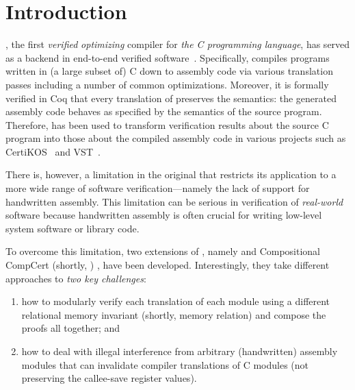\section{Introduction}\label{sec:introduction}


\cc{} \cite{CompCert, Compcert-CACM}, the first \emph{verified}
\emph{optimizing} compiler for \emph{the C programming language}, has
served as a backend in end-to-end verified
software~\cite{appel2014program}. Specifically, \cc{} compiles programs written in (a
large subset of) C down to assembly code via various translation
passes including a number of common optimizations.  Moreover, it is
formally verified in Coq that every translation of \cc{} preserves the
semantics: the generated assembly code behaves as specified by the
semantics of the source program. Therefore, \cc{} has been used to
transform verification results about the source C program into those
about the compiled assembly code in various projects such as
CertiKOS~\cite{CertiKOS11, CertiKOS16} and VST~\cite{VST}.

There is, however, a limitation in the original \cc{} that restricts
its application to a more wide range of software verification---namely
the lack of support for handwritten assembly. This
limitation can be serious in verification of \emph{real-world}
software because handwritten assembly is often crucial for writing
low-level system software or library code.

To overcome this limitation, two extensions of \cc{}, namely \ccx{}
\cite{gu:dscal,wang:saccx} and Compositional CompCert (shortly, \ccc{}) \cite{beringer:isem,stewart:ccc}, have
been developed. Interestingly, they take different approaches to
\emph{two key challenges}:
\begin{enumerate}
\item how to modularly verify each translation of each
module using a different relational memory invariant (shortly, memory relation) and compose the proofs all
together; and
\item how to deal with illegal interference from
arbitrary (handwritten) assembly modules that can invalidate compiler
translations of C modules (\eg not preserving the
callee-save register values).
\end{enumerate}

